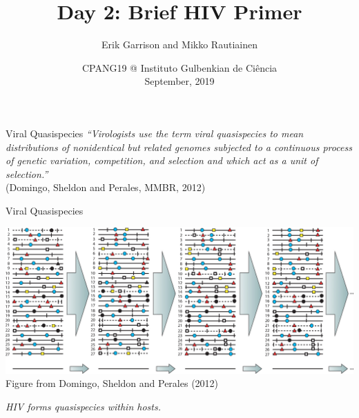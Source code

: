 \documentclass[notes=hide]{beamer}
\title{Day 2: Brief HIV Primer}
\author[TM]{Erik Garrison and Mikko Rautiainen}
\date{CPANG19 @ Instituto Gulbenkian de Ci\^{e}ncia\\ September, 2019}
\newcommand{\0}{\ensuremath{\mathtt{0}}}
\newcommand{\1}{\ensuremath{\mathtt{1}}}
\begin{document}
\frame[plain]{\titlepage}



\begin{frame}{Viral Quasispecies}
\textit{``Virologists use the term viral quasispecies to mean distributions of nonidentical but related genomes subjected to a continuous process of genetic variation, competition, and selection and which act as a unit of selection.''}\\
(Domingo, Sheldon and Perales, MMBR, 2012)
\end{frame}

\begin{frame}{Viral Quasispecies}
\begin{center}
\includegraphics[width=\textwidth]{figs/quasispecies-model}\\[.5em]
{\scriptsize Figure from Domingo, Sheldon and Perales (2012)}
\end{center}
\begin{block}{}
\centering \emph{HIV forms quasispecies within hosts.} 
\end{block}
\end{frame}
\end{document}
